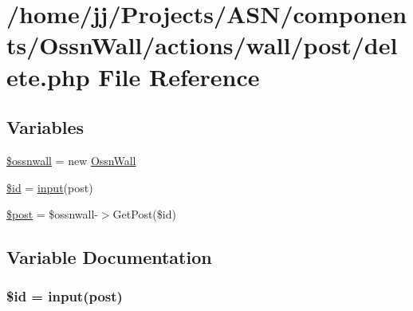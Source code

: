 \hypertarget{components_2_ossn_wall_2actions_2wall_2post_2delete_8php}{}\section{/home/jj/\+Projects/\+A\+S\+N/components/\+Ossn\+Wall/actions/wall/post/delete.php File Reference}
\label{components_2_ossn_wall_2actions_2wall_2post_2delete_8php}
\subsection*{Variables}
\begin{DoxyCompactItemize}
\item 
\hyperlink{components_2_ossn_wall_2actions_2wall_2post_2delete_8php_a1aa9dcfb6514911b971879192392058a}{\$ossnwall} = new \hyperlink{class_ossn_wall}{Ossn\+Wall}
\item 
\hyperlink{components_2_ossn_wall_2actions_2wall_2post_2delete_8php_ae97941710d863131c700f069b109991e}{\$id} = \hyperlink{ossn_8lib_8input_8php_a64ebee98b041c4f75f71ed3cd73cc8ed}{input}(\textquotesingle{}post\textquotesingle{})
\item 
\hyperlink{components_2_ossn_wall_2actions_2wall_2post_2delete_8php_a53d6c7669d97392c407c4f959a5263db}{\$post} = \$ossnwall-\/$>$Get\+Post(\$id)
\end{DoxyCompactItemize}


\subsection{Variable Documentation}
\subsubsection[{\texorpdfstring{\$id}{$id}}]{\setlength{\rightskip}{0pt plus 5cm}\$id = {\bf input}(\textquotesingle{}post\textquotesingle{})}\hypertarget{components_2_ossn_wall_2actions_2wall_2post_2delete_8php_ae97941710d863131c700f069b109991e}{}\label{components_2_ossn_wall_2actions_2wall_2post_2delete_8php_ae97941710d863131c700f069b109991e}


